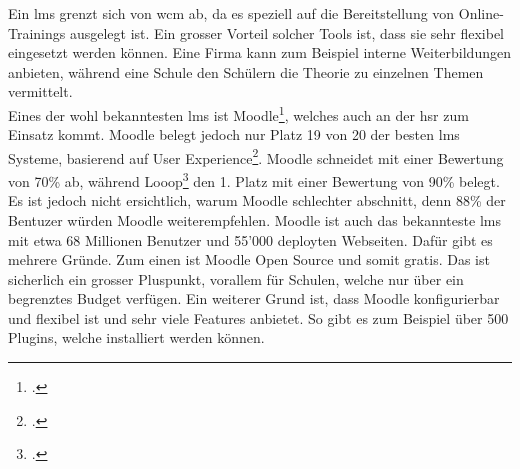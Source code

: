 Ein \gls{lms} grenzt sich von \gls{wcm} ab, da es speziell auf die Bereitstellung von Online-Trainings ausgelegt ist. Ein grosser Vorteil solcher Tools ist, dass sie sehr flexibel eingesetzt werden können. Eine Firma kann zum Beispiel interne Weiterbildungen anbieten, während eine Schule den Schülern die Theorie zu einzelnen Themen vermittelt. \\

Eines der wohl bekanntesten \gls{lms} ist Moodle\footcite{moodle_homepage}, welches auch an der \gls{hsr} zum Einsatz kommt. Moodle belegt jedoch nur Platz 19 von 20 der besten \gls{lms} Systeme, basierend auf User Experience\footcite{moodle_ux}. Moodle schneidet mit einer Bewertung von 70\% ab, während Looop\footcite{looop_homepage} den 1. Platz mit einer Bewertung von 90\% belegt. Es ist jedoch nicht ersichtlich, warum Moodle schlechter abschnitt, denn 88\% der Bentuzer würden Moodle weiterempfehlen. Moodle ist auch das bekannteste \gls{lms} mit etwa 68 Millionen Benutzer und 55'000 deployten Webseiten. Dafür gibt es mehrere Gründe. Zum einen ist Moodle Open Source und somit gratis. Das ist sicherlich ein grosser Pluspunkt, vorallem für Schulen, welche nur über ein begrenztes Budget verfügen. Ein weiterer Grund ist, dass Moodle konfigurierbar und flexibel ist und sehr viele Features anbietet. So gibt es zum Beispiel über 500 Plugins, welche installiert werden können. \\

%
%
%


